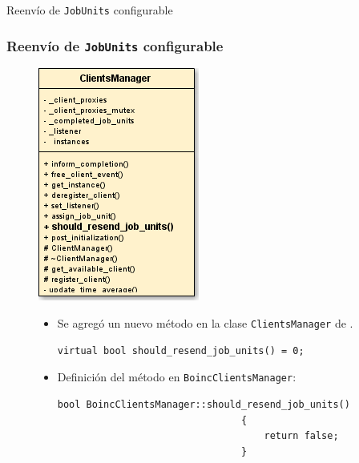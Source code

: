 \begin{subsection}{Reenvío de \texttt{JobUnits} configurable}

	\begin{frame}[fragile]\frametitle{Reenvío de \texttt{JobUnits} configurable}
  		\begin{figure}[h] 		
    		\begin{minipage}{0.26 \textwidth}
      			\includegraphics[scale=0.5]{images/ClientsManager-resend-jobunit.png}
    		\end{minipage}
    		\hfill
    		\begin{minipage}{0.64 \textwidth}
      			\begin{block}{}
      				\begin{itemize}\addtolength{\itemsep}{4mm}
						\item Se agregó un nuevo método en la clase \texttt{ClientsManager} de \fud.
							\begin{lstlisting}[basicstyle=\tiny]
								virtual bool should_resend_job_units() = 0;
							\end{lstlisting}
						\item Definición del método en \texttt{BoincClientsManager}:
							\begin{lstlisting}[basicstyle=\tiny]
								bool BoincClientsManager::should_resend_job_units()
								{
								    return false;
								}
							\end{lstlisting}
					\end{itemize}
      			\end{block}
      		\end{minipage}
      	\end{figure}
	\end{frame}
	

\end{subsection}
